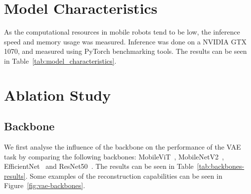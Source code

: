\section{Model Characteristics}

As the computational resources in mobile robots tend to be low, the inference speed and memory usage was measured. Inference was done on a NVIDIA GTX 1070, and measured using PyTorch benchmarking tools. The results can be seen in Table~\ref{tab:model_characteristics}.




\section{Ablation Study}
\subsection{Backbone}
We first analyse the influence of the backbone on the performance of the VAE task by comparing the following backbones: MobileViT~\cite{Mehta2022SeparableSF}, MobileNetV2~\cite{sandler2019mobilenetv2invertedresidualslinear}, EfficientNet~\cite{tan2020efficientnetrethinkingmodelscaling} and ResNet50~\cite{he2015deep}. The results can be seen in Table~\ref{tab:backbones-results}. Some examples of the reconstruction capabilities can be seen in Figure~\ref{fig:vae-backbones}.

